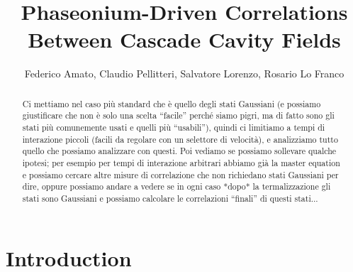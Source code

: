 \documentclass[]{article}
\title{Phaseonium-Driven Correlations Between Cascade Cavity Fields}
\author{Federico Amato, Claudio Pellitteri, Salvatore Lorenzo, Rosario Lo Franco}
\begin{document}
\maketitle

\begin{abstract}
{Ci mettiamo nel caso più standard che è quello degli stati Gaussiani (e possiamo giustificare che non è solo una scelta ``facile'' perché siamo pigri, ma di fatto sono gli stati più comunemente usati e quelli più ``usabili''), quindi ci limitiamo a tempi di interazione piccoli (facili da regolare con un selettore di velocità), e analizziamo tutto quello che possiamo analizzare con questi. Poi vediamo se possiamo sollevare qualche ipotesi; per esempio per tempi di interazione arbitrari abbiamo già la master equation e possiamo cercare altre misure di correlazione che non richiedano stati Gaussiani per dire, oppure possiamo andare a vedere se in ogni caso *dopo* la termalizzazione gli stati sono Gaussiani e possiamo calcolare le correlazioni ``finali'' di questi stati...}
\end{abstract}



\section{Introduction}
\end{document}
